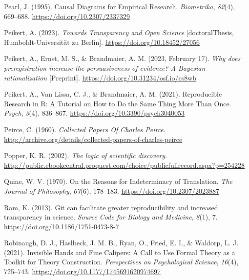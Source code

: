\documentclass[
  man, noextraspace,floatsintext]{apa7}
\newlength{\cslhangindent}
\newenvironment{CSLReferences}[2] %
 {\begin{list}{}{%
  \setlength{\itemindent}{0pt}
  \setlength{\leftmargin}{0pt}
  \setlength{\parsep}{0pt}
  \ifodd #1
   \setlength{\leftmargin}{\cslhangindent}
   \setlength{\itemindent}{-1\cslhangindent}
  \fi
  \setlength{\itemsep}{#2\baselineskip}}}
 {\end{list}}
\begin{document}
\begin{CSLReferences}{1}{0}
Pearl, J. (1995). Causal {Diagrams} for {Empirical Research}. \emph{Biometrika}, \emph{82}(4), 669--688. \url{https://doi.org/10.2307/2337329}

Peikert, A. (2023). \emph{Towards {Transparency} and {Open Science}} {[}doctoralThesis, Humboldt-Universität zu Berlin{]}. \url{https://doi.org/10.18452/27056}

Peikert, A., Ernst, M. S., \& Brandmaier, A. M. (2023, February 17). \emph{Why does preregistration increase the persuasiveness of evidence? {A Bayesian} rationalization} {[}Preprint{]}. \url{https://doi.org/10.31234/osf.io/cs8wb}

Peikert, A., Van Lissa, C. J., \& Brandmaier, A. M. (2021). Reproducible {Research} in {R}: {A Tutorial} on {How} to {Do} the {Same Thing More Than Once}. \emph{Psych}, \emph{3}(4), 836--867. \url{https://doi.org/10.3390/psych3040053}

Peirce, C. (1960). \emph{Collected {Papers Of Charles Peirce}}. \url{http://archive.org/details/collected-papers-of-charles-peirce}

Popper, K. R. (2002). \emph{The logic of scientific discovery}. \url{http://public.ebookcentral.proquest.com/choice/publicfullrecord.aspx?p=254228}

Quine, W. V. (1970). On the {Reasons} for {Indeterminacy} of {Translation}. \emph{The Journal of Philosophy}, \emph{67}(6), 178--183. \url{https://doi.org/10.2307/2023887}

Ram, K. (2013). Git can facilitate greater reproducibility and increased transparency in science. \emph{Source Code for Biology and Medicine}, \emph{8}(1), 7. \url{https://doi.org/10.1186/1751-0473-8-7}

Robinaugh, D. J., Haslbeck, J. M. B., Ryan, O., Fried, E. I., \& Waldorp, L. J. (2021). Invisible {Hands} and {Fine Calipers}: {A Call} to {Use Formal Theory} as a {Toolkit} for {Theory Construction}. \emph{Perspectives on Psychological Science}, \emph{16}(4), 725--743. \url{https://doi.org/10.1177/1745691620974697}


\end{CSLReferences}
\end{document}
